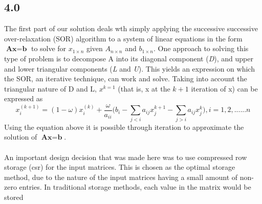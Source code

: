 \documentclass[paper=a4, fontsize=10pt]{article} %
\begin{document}
\subsection{4.0}
{The first part of our solution  deals wth simply applying the successive successive over-relaxation (SOR) algorithm to a system of linear equations in the form $\textbf{A}\textbf{x} = \textbf{b}$ to solve for $x_{1\times n}$ given $A_{n\times n}$ and $b_{1\times n}$. One approach to solving this type of problem is to decompose A into its diagonal component ({\it D}), and upper and lower triangular components ({\it L} and {\it U}). This yields an expression on which the SOR, an iterative technique, can work and solve. Taking into account the triangular nature of D and L, $x^{k=1}$ (that is, x at the $k+1$ iteration of x) can be expressed as
\begin{equation}
x_{i}^{(k+1)} = (1 - \omega)x_{i}^{(k)} + \frac {\omega}{a_{ii}}\bigg( b_i - \sum\limits_{j<i} a_{ij} x_j^{k+1} - \sum\limits_{j>i} a_{ij}  x_j^{k} \bigg) , i = 1,2,......n
\end{equation}
Using the equation above it is possible through iteration to approximate the solution of $\textbf{A}\textbf{x} = \textbf{b}$.\\\\
An important design decision that was made here was to use compressed row storage (csr) for the input matrices. This is chosen as the optimal storage method, due to the nature of the input matrices having a small amount of non-zero entries. In traditional storage methods, each value in the matrix would be stored 
}
\end{document}
